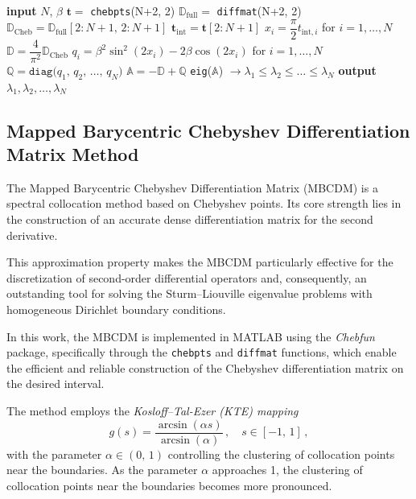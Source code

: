 \documentclass[11pt,a4paper,oneside,openright]{report} %
\begin{document}
\begin{algorithm}[H]
\caption{Chebyshev Differentiation Matrix – Coffey--Evans equation}
\label{alg_6}
{\small
\begin{algorithmic}[1]
\State \textbf{input} $N$, $\beta$
\State $\boldsymbol{t} =$ \texttt{chebpts}(N+2, 2)
\State $\mathbb{D}_{\text{full}} =$ \texttt{diffmat}(N+2, 2)
\State $\mathbb{D}_{\text{Cheb}} = \mathbb{D}_{\text{full}}[2:N+1, \, 2:N+1]$ 
\State $\boldsymbol{t}_{\text{int}} = \boldsymbol{t}[2:N+1]$
\State $x_i = \dfrac{\pi}{2}  t_{\text{int},i}$ \quad for $i=1, \dots,N$
\State $\mathbb{D} = \dfrac{4}{\pi^2} \mathbb{D}_{\text{Cheb}}$
\State $q_i =  \beta^2 \sin^2(2 x_i) - 2 \beta \cos(2x_i) $ \quad for $i=1, \dots,N$
\State $\mathbb{Q} = \texttt{diag}\big(q_1,  \, q_2,  \, \dots,  \, q_N \big)$
\State $\mathbb{A} = -\mathbb{D} + \mathbb{Q}$
\BlankLine
\State \texttt{eig}($\mathbb{A}$) $ \to \lambda_1 \leq \lambda_2 \leq \dots \leq \lambda_N$
\State \textbf{output} $\lambda_1, \lambda_2, \dots, \lambda_N$
\end{algorithmic}
}
\end{algorithm}



\subsection{Mapped Barycentric Chebyshev Differentiation Matrix Method}
\noindent
The Mapped Barycentric Chebyshev Differentiation Matrix (MBCDM) is a spectral collocation method based on Chebyshev points. Its core strength lies in the construction of an accurate dense differentiation matrix for the second derivative.

This approximation property makes the MBCDM particularly effective for the discretization of second-order differential operators and, consequently, an outstanding tool for solving the Sturm--Liouville eigenvalue problems with homogeneous Dirichlet boundary conditions.

In this work, the MBCDM is implemented in MATLAB using the \textit{Chebfun} package, specifically through the \texttt{chebpts} and \texttt{diffmat} functions, which enable the efficient and reliable construction of the Chebyshev differentiation matrix on the desired interval.


The method employs the \emph{Kosloff--Tal-Ezer (KTE) mapping}
\begin{equation}
    g(s) = \frac{\arcsin(\alpha s)}{\arcsin(\alpha)} \, , \quad s \in [-1, \, 1] \, ,
\end{equation}
with the parameter $\alpha \in (0, \, 1)$ controlling the clustering of collocation points near the boundaries. As the parameter $\alpha$  approaches 1, the clustering of collocation points near the boundaries becomes more pronounced.
\end{document}
